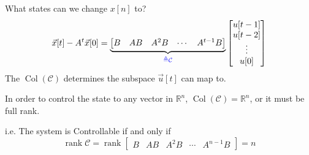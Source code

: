\begin{frame}{What states can we change \(x[n]\) to?}
    \[
        \vec x[t] - A^t \vec x[0] =
        \underbrace{\begin{bmatrix}
            B & AB & A^2 B & \cdots & A^{t - 1} B
        \end{bmatrix}}_{\color{blue}\triangleq \mathcal{C}}
        \begin{bmatrix}
            u[t - 1] \\
            u[t - 2] \\
            \vdots \\
            u[0] \\
        \end{bmatrix}
    \]
    \providecommand{\Col}{\operatorname{Col}}
    \providecommand{\rank}{\operatorname{rank}}
    The \(\Col(\mathcal{C})\) determines the subspace \(\vec u[t]\) can map to.

    In order to control the state to any vector in \(\mathbb{R}^n\), \(\Col(\mathcal{C}) = \mathbb{R}^n\), or it must be full rank.

    i.e. The system is Controllable if and only if
    \[
        \rank{\mathcal{C}} = \rank\begin{bmatrix}
            B & AB & A^2 B & \cdots & A^{n - 1} B
        \end{bmatrix} = n
    \]

\end{frame}
